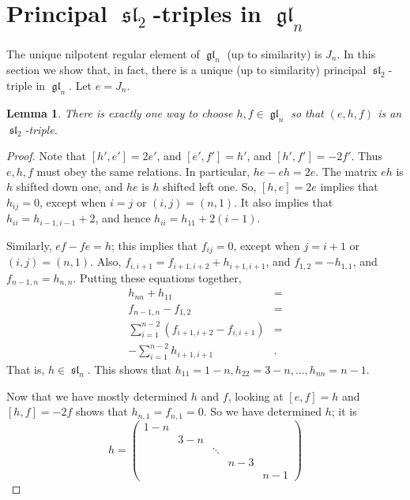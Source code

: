 \documentclass[12pt,psamsfonts]{article}
\DeclareMathOperator{\gl}{\mathfrak{gl}}
\DeclareMathOperator{\spl}{\mathfrak{sl}}
\newtheorem{lemma}[theorem]{Lemma}
\begin{document}
\section{Principal \texorpdfstring{\(\spl_2\)}{sl\_2}-triples in \texorpdfstring{\(\gl_n\)}{gl\_n}}\label{principal_sl2}
The unique nilpotent regular element of \(\gl_n\) (up to similarity) is \(J_n\).
In this section we show that, in fact, there is a unique (up to similarity) principal \(\spl_2\)-triple in \(\gl_n\).
Let \(e = J_n\).
\begin{lemma}\label{simple_sl2_triple}
    There is exactly one way to choose \(h, f \in \gl_n\) so that \((e, h, f)\) is an \(\spl_2\)-triple.
\end{lemma}
\begin{proof}
    
Note that \([h', e'] = 2e'\), and \([e', f'] = h'\), and \([h', f'] = -2f'\).
Thus \(e, h, f\) must obey the same relations.
In particular, \(he - eh = 2e\).  
The matrix \(eh\) is \(h\) shifted down one, and \(he\) is \(h\) shifted left one.
So, \([h,e] = 2e\) implies that \(h_{ij} = 0\), except when \(i = j\) or \((i,j) = (n,1)\).
It also implies that \(h_{ii} = h_{i - 1, i - 1} + 2\), and hence \(h_{ii} = h_{11} + 2(i - 1)\).
\par Similarly, \(ef - fe = h\); this implies that \(f_{ij} = 0\), except when \(j = i + 1\) or \((i,j) = (n,1)\).
Also, \(f_{i,i + 1} = f_{i + 1, i + 2} + h_{i + 1, i + 1}\), and \(f_{1,2} = -h_{1, 1}\), and \(f_{n - 1, n} = h_{n,n}\).
Putting these equations together,
\begin{align*}
    h_{nn} + h_{11} & = \\
    f_{n - 1,n} - f_{1,2} & = \\
    \sum_{i = 1}^{n - 2} (f_{i + 1, i + 2} - f_{i,i + 1}) & = \\
    - \sum_{i = 1}^{n - 2} h_{i + 1, i + 1} & .
\end{align*}
That is, \(h \in \spl_n\).
This shows that \(h_{11} = 1 - n, h_{22} = 3 - n, ..., h_{nn} = n - 1\).
\par Now that we have mostly determined \(h\) and \(f\), looking at \([e,f] = h\) and \([h,f] = -2f\) shows that \(h_{n,1} = f_{n,1} = 0\).
So we have determined \(h\); it is 
\[h = \begin{pmatrix}
    1 - n  & \\
    & 3 - n \\
    & & \ddots \\
    & & & n - 3 \\
    & & & & n - 1 

\end{pmatrix}\]
\end{proof}
\end{document}
